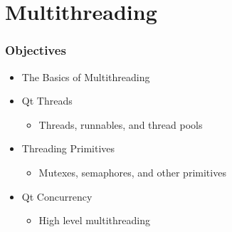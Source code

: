 %
%
%
%

\section{Multithreading}
\begin{slide}[fragile]
\frametitle{Objectives}
\begin{itemize}
\item The Basics of Multithreading
\item Qt Threads
    \begin{itemize}
    \item Threads, runnables, and thread pools
    \end{itemize}
\item Threading Primitives
    \begin{itemize}
    \item Mutexes, semaphores, and other primitives
    \end{itemize}
\item Qt Concurrency
    \begin{itemize}
    \item High level multithreading
    \end{itemize}
\end{itemize}
\end{slide}


%
%
